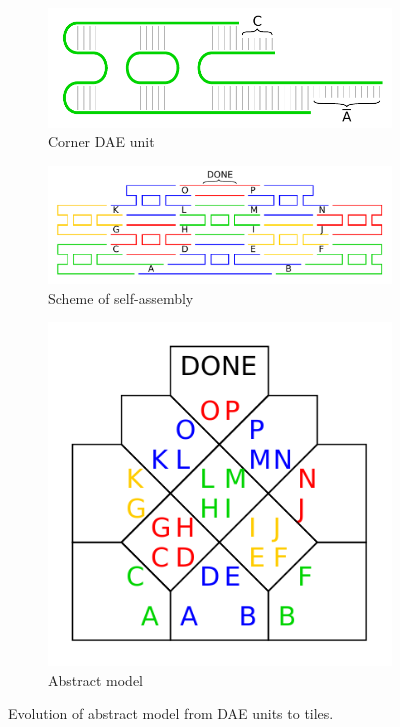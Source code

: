 \begin{figure}[h]
\begin{center}
	\begin{subfigure}[b]{0.31\textwidth}
		\includegraphics[width=\textwidth]{./figures/tile_model/DNA_struct.pdf} %
		\caption{Corner DAE unit}
		\label{fig:DNA_struct}
	\end{subfigure}
	\begin{subfigure}[b]{0.472\textwidth}
		\includegraphics[width=\textwidth]{./figures/tile_model/DNA_assembly.pdf} %
		\caption{Scheme of self-assembly}
		\label{fig:DNA_assembly}
	\end{subfigure}
	\begin{subfigure}[b]{0.190\textwidth}
		\includegraphics[width=\textwidth]{./figures/tile_model/abstract_model.pdf} %
		\caption{Abstract model}
		\label{fig:abstract_model}
	\end{subfigure}
	\caption{Evolution of abstract model from DAE units to tiles.}
	\label{fig:evolution}
\end{center}
\end{figure}
